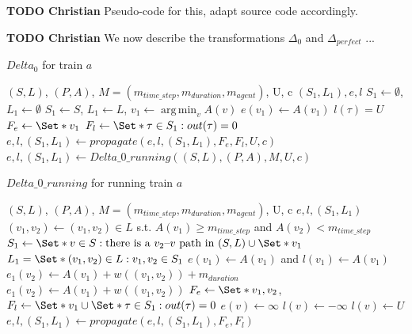 \documentclass{article}
\DeclareMathOperator*{\argmin}{arg\,min}
\begin{document}
\begin{mdframed}
{\bf TODO Christian} Pseudo-code for this, adapt source code accordingly.
\end{mdframed}




\begin{mdframed}
{\bf TODO Christian} We now describe the transformations $\Delta_0$ and $\Delta_{perfect}$ ...
\end{mdframed}




\begin{algorithm}
	\caption{$Delta_0$ for train $a$} \label{algo:Delta0}
	\begin{algorithmic}[1]
		\Require $(S,L)$, $(P,A)$, $M=(m_{time\_step},m_{duration},m_{agent})$, U, c
	    \Ensure $(S_1,L_1),e,l$
            \State $S_1\leftarrow \emptyset$, $L_1 \leftarrow \emptyset$
            \State $S_1 \leftarrow S$, $L_1 \leftarrow L$,
            \State $v_1 \leftarrow \argmin_{v} A(v)$
            \State $e(v_1) \leftarrow A(v_1)$
                \State $l(\tau)=U$
            \EndFor
            \State $F_e \leftarrow \Set*{v_1}$
            \State $F_l \leftarrow \Set*{\tau \in S_1: out(\tau)=0}$
            \State $e,l,(S_1,L_1) \leftarrow propagate(e,l,(S_1,L_1),F_e,F_l, U, c)$
        \Else
            \State $e,l,(S_1,L_1) \leftarrow Delta\_0\_running((S,L), (P,A), M, U, c)$
        \EndIf
\end{algorithmic}
\end{algorithm}

\begin{algorithm}
	\caption{$Delta\_0\_running$ for running train $a$} \label{algo:Delta0running}
	\begin{algorithmic}[1]
		\Require $(S,L)$, $(P,A)$, $M=(m_{time\_step},m_{duration},m_{agent})$, U, c
	    \Ensure $e,l,(S_1,L_1)$
	    \State $(v_1,v_2) \leftarrow (v_1,v_2) \in L$ s.t. $A(v_1)\geq m_{time\_step}$ and $A(v_2)<m_{time\_step}$
		\State $S_1 \leftarrow \Set*{v \in S: \textrm{there is a }v_2\textrm{--}v\textrm{ path in }(S,L)} \cup \Set*{v_1}$
		\State $L_1=\Set*{(v_1,v_2) \in L: v_1,v_2 \in S_1}$
		\State $e(v_1)\leftarrow A(v_1)$ and $l(v_1) \leftarrow A(v_1)$
            \State $e_1(v_2) \leftarrow A(v_1)+w((v_1,v_2))+m_{duration}$
        \Else
            \State $e_1(v_2) \leftarrow A(v_1)+w((v_1,v_2))$
        \EndIf
        \State $F_e \leftarrow \Set*{v_1,v_2}$, $F_l \leftarrow \Set*{v_1} \cup \Set*{\tau \in S_1: out(\tau)=0}$
	        \State $e(v) \leftarrow \infty$
	    \EndFor
	        \State $l(v) \leftarrow -\infty$
	    \EndFor
	        \State $l(v) \leftarrow U$
	    \EndFor
		\State $e,l,(S_1,L_1) \leftarrow propagate(e,l,(S_1,L_1),F_e,F_l)$
	\end{algorithmic}
\end{algorithm}
\end{document}
